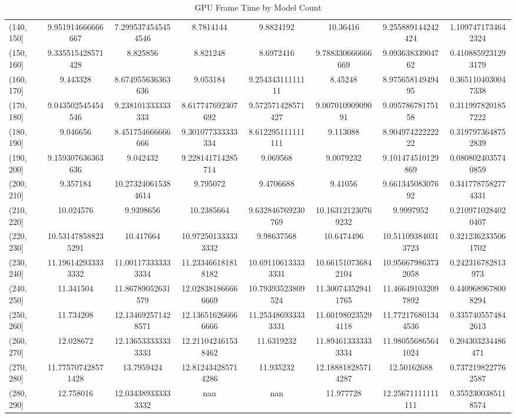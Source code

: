 \begin{table}[H]
\begin{tabular}{|l |c |c |c |c |c |c |c|}
(140, 150] & 9.951914666666667 & 7.2995374545454546 & 8.7814144 & 9.8824192 & 10.36416 & 9.255889144242424 & 1.1097471734642324 \\
(150, 160] & 9.335515428571428 & 8.825856 & 8.821248 & 8.6972416 & 9.788330666666669 & 9.09363833904762 & 0.4108859231293179 \\
(160, 170] & 9.443328 & 8.674955636363636 & 9.053184 & 9.25434311111111 & 8.45248 & 8.97565814949495 & 0.3651104030047338 \\
(170, 180] & 9.043502545454546 & 9.238101333333333 & 8.617747692307692 & 9.572571428571427 & 9.00701090909091 & 9.09578678175158 & 0.3119978201857222 \\
(180, 190] & 9.046656 & 8.451754666666666 & 9.301077333333334 & 8.612295111111111 & 9.113088 & 8.90497422222222 & 0.3197973648752839 \\
(190, 200] & 9.159307636363636 & 9.042432 & 9.228141714285714 & 9.069568 & 9.0079232 & 9.101474510129869 & 0.0808024035740859 \\
(200, 210] & 9.357184 & 10.273240615384614 & 9.795072 & 9.4706688 & 9.41056 & 9.66134508307692 & 0.3417787582774331 \\
(210, 220] & 10.024576 & 9.9398656 & 10.2385664 & 9.632846769230769 & 10.163121230769232 & 9.9997952 & 0.2109710284020407 \\
(220, 230] & 10.531478588235291 & 10.417664 & 10.972501333333332 & 9.98637568 & 10.6474496 & 10.511093840313723 & 0.3212362335061702 \\
(230, 240] & 11.196142933333332 & 11.001173333333334 & 11.233466181818182 & 10.691106133333331 & 10.661510736842104 & 10.956679863732058 & 0.242316782813973 \\
(240, 250] & 11.341504 & 11.86789052631579 & 12.028381866666669 & 10.79393523809524 & 11.300743529411765 & 11.466491032097892 & 0.4409689678008294 \\
(250, 260] & 11.734208 & 12.134692571428571 & 12.136516266666666 & 11.253486933333331 & 11.601980235294118 & 11.772176801344536 & 0.3357405574842613 \\
(260, 270] & 12.028672 & 12.136533333333333 & 12.211042461538462 & 11.6319232 & 11.894613333333334 & 11.980556865641024 & 0.204303234486471 \\
(270, 280] & 11.775707428571428 & 13.7959424 & 12.812434285714286 & 11.935232 & 12.188818285714287 & 12.50162688 & 0.7372198227762587 \\
(280, 290] & 12.758016 & 12.034389333333332 & nan & nan & 11.977728 & 12.25671111111111 & 0.3552300385118574 \\
\hline
\end{tabular}
\caption{GPU Frame Time by Model Count}
\label{tab:gpu_frame_time}
\end{table}


